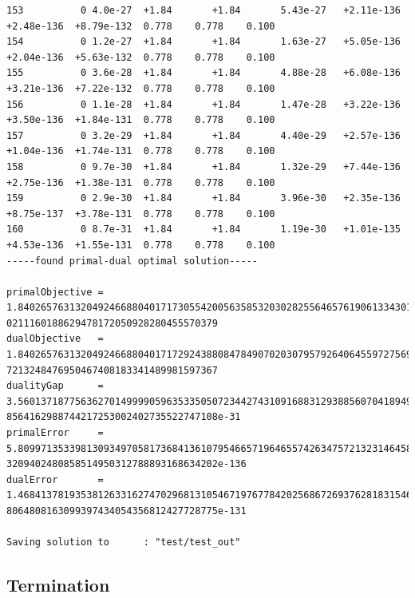 \documentclass[12pt]{article}
\numberwithin{equation}{section}
\begin{document}
\begin{lstlisting}
153          0 4.0e-27  +1.84       +1.84       5.43e-27   +2.11e-136  +2.48e-136  +8.79e-132  0.778    0.778    0.100
154          0 1.2e-27  +1.84       +1.84       1.63e-27   +5.05e-136  +2.04e-136  +5.63e-132  0.778    0.778    0.100
155          0 3.6e-28  +1.84       +1.84       4.88e-28   +6.08e-136  +3.21e-136  +7.22e-132  0.778    0.778    0.100
156          0 1.1e-28  +1.84       +1.84       1.47e-28   +3.22e-136  +3.50e-136  +1.84e-131  0.778    0.778    0.100
157          0 3.2e-29  +1.84       +1.84       4.40e-29   +2.57e-136  +1.04e-136  +1.74e-131  0.778    0.778    0.100
158          0 9.7e-30  +1.84       +1.84       1.32e-29   +7.44e-136  +2.75e-136  +1.38e-131  0.778    0.778    0.100
159          0 2.9e-30  +1.84       +1.84       3.96e-30   +2.35e-136  +8.75e-137  +3.78e-131  0.778    0.778    0.100
160          0 8.7e-31  +1.84       +1.84       1.19e-30   +1.01e-135  +4.53e-136  +1.55e-131  0.778    0.778    0.100
-----found primal-dual optimal solution-----

primalObjective = 1.84026576313204924668804017173055420056358532030282556465761906133430166726537336826049865612094019
0211160188629478172050928280455570379
dualObjective   = 1.84026576313204924668804017172924388084784907020307957926406455972756967820389551729116356865203683
7213248476950467408183341489981597367
dualityGap      = 3.56013718775636270149999059635335050723442743109168831293885607041894974620853522385695653183532885
8564162988744217253002402735522747108e-31
primalError     = 5.80997135339813093497058173684136107954665719646557426347572132314645807188713585157511697443878587
3209402480858514950312788893168634202e-136
dualError       = 1.46841378193538126331627470296813105467197677842025686726937628183154614032611825901779694044217367
8064808163099397434054356812427728775e-131

Saving solution to      : "test/test_out"
\end{lstlisting}

\subsection{Termination}
\end{document}
